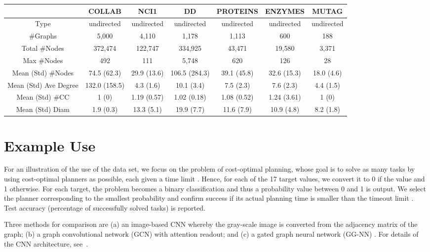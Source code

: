 \documentclass{article}
\begin{document}
\begin{table*}[ht]
\begin{threeparttable}
\vskip 10pt
\begin{tabular}{ccccccc}
\hline
 & COLLAB & NCI1 & DD & PROTEINS & ENZYMES & MUTAG \\
\hline
Type          & undirected & undirected & undirected & undirected & undirected & undirected\\
\#Graphs      & 5,000 & 4,110 & 1,178 & 1,113 & 600 & 188\\
Total \#Nodes & 372,474 & 122,747 & 334,925 & 43,471 & 19,580 & 3,371\\
Max \#Nodes   & 492 & 111 & 5,748 & 620 & 126 & 28\\
Mean (Std) \#Nodes
              & 74.5 (62.3) & 29.9 (13.6) & 106.5 (284.3) & 39.1 (45.8) & 32.6 (15.3) & 18.0 (4.6)\\
Mean (Std) Ave Degree\tnote{1}
              & 132.0 (158.5) & 4.3 (1.6) & 10.1 (3.4) & 7.5 (2.3) & 7.6 (2.3) & 4.4 (1.5)\\
Mean (Std) \#CC\tnote{2}
              & 1 (0) & 1.19 (0.57) & 1.02 (0.18) & 1.08 (0.52) & 1.24 (3.61) & 1 (0)\\
Mean (Std) Diam\tnote{3,4}
              & 1.9 (0.3) & 13.3 (5.1) & 19.9 (7.7) & 11.6 (7.9) & 10.9 (4.8) & 8.2 (1.8)\\
\hline
\end{tabular}

\end{threeparttable}
\end{table*}


\section{Example Use}\label{sec:use}
For an illustration of the use of the data set, we focus on the problem of cost-optimal planning, whose goal is to solve as many tasks by using cost-optimal planners as possible, each given a time limit . Hence, for each of the 17 target values, we convert it to 0 if the value  and 1 otherwise. For each target, the problem becomes a binary classification and thus a probability value between 0 and 1 is output. We select the planner corresponding to the smallest probability and confirm success if its actual planning time is smaller than the timeout limit . Test accuracy (percentage of successfully solved tasks) is reported.

Three methods for comparison are (a) an image-based CNN whereby the gray-scale image is converted from the adjacency matrix of the graph; (b) a graph convolutional network (GCN) \citep{Kipf2017} with attention readout; and (c) a gated graph neural network (GG-NN) \citep{Li2016}. For details of the CNN architecture, see~\citet{katz-et-al-ipc2018}.
\end{document}
